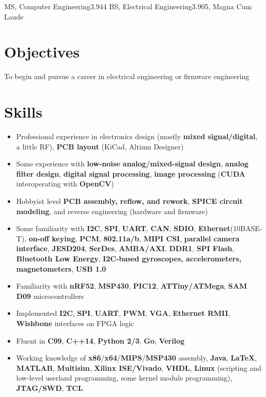 \documentclass{my_resume}
\begin{document}

    {MS, Computer Engineering}{3.944}
	{BS, Electrical Engineering}{3.905, Magna Cum Laude}

\section{Objectives}
To begin and pursue a career in electrical engineering or firmware engineering

\section{Skills}
\begin{itemize}[noitemsep]
    \item Professional experience in electronics design (mostly \textbf{mixed signal/digital}, a little RF), \textbf{PCB layout} (KiCad, Altium Designer)
    \item Some experience with \textbf{low-noise analog/mixed-signal design}, \textbf{analog filter design}, \textbf{digital signal processing}, \textbf{image processing} (\textbf{CUDA} interoperating with \textbf{OpenCV})
    \item Hobbyist level \textbf{PCB assembly, reflow, and rework}, \textbf{SPICE circuit modeling}, and reverse engineering (hardware and firmware)
    \item Some familiarity with \textbf{I2C}, \textbf{SPI}, \textbf{UART}, \textbf{CAN}, \textbf{SDIO}, \textbf{Ethernet}(10BASE-T), \textbf{on-off keying}, \textbf{PCM}, \textbf{802.11a/b}, \textbf{MIPI CSI}, \textbf{parallel camera interface}, \textbf{JESD204}, \textbf{SerDes}, \textbf{AMBA/AXI}, \textbf{DDR1}, \textbf{SPI Flash}, \textbf{Bluetooth Low Energy}, \textbf{I2C-based gyroscopes, accelerometers, magnetometers}, \textbf{USB 1.0}
    \item Familiarity with \textbf{nRF52}, \textbf{MSP430}, \textbf{PIC12}, \textbf{ATTiny/ATMega}, \textbf{SAM D09} microcontrollers
    \item Implemented \textbf{I2C}, \textbf{SPI}, \textbf{UART}, \textbf{PWM}, \textbf{VGA}, \textbf{Ethernet RMII}, \textbf{Wishbone} interfaces on FPGA logic
    \item Fluent in \textbf{C99}, \textbf{C++14}, \textbf{Python 2/3}, \textbf{Go}, \textbf{Verilog}
    \item Working knowledge of \textbf{x86}/\textbf{x64}/\textbf{MIPS}/\textbf{MSP430} assembly, \textbf{Java}, \textbf{LaTeX}, \textbf{MATLAB}, \textbf{Multisim}, \textbf{Xilinx ISE/Vivado}, \textbf{VHDL}, \textbf{Linux} (scripting and low-level userland programming, some kernel module programming), \textbf{JTAG/SWD}, \textbf{TCL}
\end{itemize}
\end{document}
